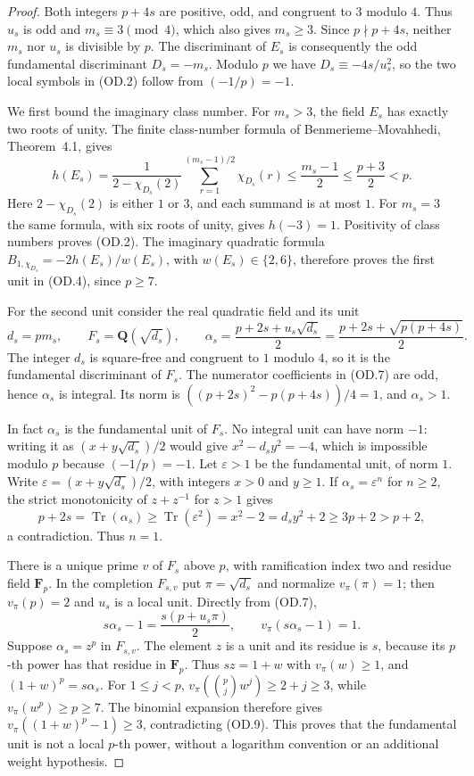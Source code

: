 \begin{proof}
Both integers $p+4s$ are positive, odd, and congruent to $3$ modulo
$4$.  Thus $u_s$ is odd and $m_s\equiv3\pmod4$, which also gives
$m_s\geq3$.  Since $p\nmid p+4s$, neither $m_s$ nor $u_s$ is
divisible by $p$.  The discriminant of $E_s$ is consequently the
odd fundamental discriminant $D_s=-m_s$.  Modulo $p$ we have
$D_s\equiv-4s/u_s^2$, so the two local symbols in (OD.2) follow
from $(-1/p)=-1$.

We first bound the imaginary class number.  For $m_s>3$, the field
$E_s$ has exactly two roots of unity.  The finite class-number
formula of Benmerieme--Movahhedi, Theorem~4.1, gives
\[
 h(E_s)=\frac{1}{2-\chi_{D_s}(2)}
       \sum_{r=1}^{(m_s-1)/2}\chi_{D_s}(r)
 \leq\frac{m_s-1}{2}\leq\frac{p+3}{2}<p.                \tag{OD.6}
\]
Here $2-\chi_{D_s}(2)$ is either $1$ or $3$, and each summand
is at most $1$.  For $m_s=3$ the same formula, with six roots of
unity, gives $h(-3)=1$.  Positivity of class numbers proves (OD.2).
The imaginary quadratic formula
$B_{1,\chi_{D_s}}=-2h(E_s)/w(E_s)$, with $w(E_s)\in\{2,6\}$,
therefore proves the first unit in (OD.4), since $p\geq7$.

For the second unit consider the real quadratic field and its unit
\[
 d_s=pm_s,\qquad F_s=\mathbf Q(\sqrt{d_s}),\qquad
 \alpha_s=\frac{p+2s+u_s\sqrt{d_s}}2
          =\frac{p+2s+\sqrt{p(p+4s)}}2.                 \tag{OD.7}
\]
The integer $d_s$ is square-free and congruent to $1$ modulo $4$,
so it is the fundamental discriminant of $F_s$.  The numerator
coefficients in (OD.7) are odd, hence $\alpha_s$ is integral.
Its norm is $((p+2s)^2-p(p+4s))/4=1$, and $\alpha_s>1$.

In fact $\alpha_s$ is the fundamental unit of $F_s$.
No integral unit can have norm $-1$: writing it as
$(x+y\sqrt{d_s})/2$ would give $x^2-d_sy^2=-4$, which is
impossible modulo $p$ because $(-1/p)=-1$.  Let $\varepsilon>1$
be the fundamental unit, of norm $1$.  Write
$\varepsilon=(x+y\sqrt{d_s})/2$, with integers $x>0$ and
$y\geq1$.  If $\alpha_s=\varepsilon^n$ for $n\geq2$, the
strict monotonicity of $z+z^{-1}$ for $z>1$ gives
\[
 p+2s=\operatorname{Tr}(\alpha_s)
 \geq\operatorname{Tr}(\varepsilon^2)
 =x^2-2=d_sy^2+2\geq3p+2>p+2,                         \tag{OD.8}
\]
a contradiction.  Thus $n=1$.

There is a unique prime $v$ of $F_s$ above $p$, with ramification
index two and residue field $\mathbf F_p$.  In the completion
$F_{s,v}$ put $\pi=\sqrt{d_s}$ and normalize $v_\pi(\pi)=1$;
then $v_\pi(p)=2$ and $u_s$ is a local unit.  Directly from
(OD.7),
\[
 s\alpha_s-1=\frac{s(p+u_s\pi)}2,
 \qquad v_\pi(s\alpha_s-1)=1.                           \tag{OD.9}
\]
Suppose $\alpha_s=z^p$ in $F_{s,v}$.  The element $z$ is a unit
and its residue is $s$, because its $p$-th power has that residue
in $\mathbf F_p$.  Thus $sz=1+w$ with $v_\pi(w)\geq1$, and
$(1+w)^p=s\alpha_s$.  For $1\leq j<p$,
$v_\pi(\binom pj w^j)\geq2+j\geq3$, while
$v_\pi(w^p)\geq p\geq7$.  The binomial expansion therefore
gives $v_\pi((1+w)^p-1)\geq3$, contradicting (OD.9).
This proves that the fundamental unit is not a local $p$-th power,
without a logarithm convention or an additional weight hypothesis.


\end{proof}
